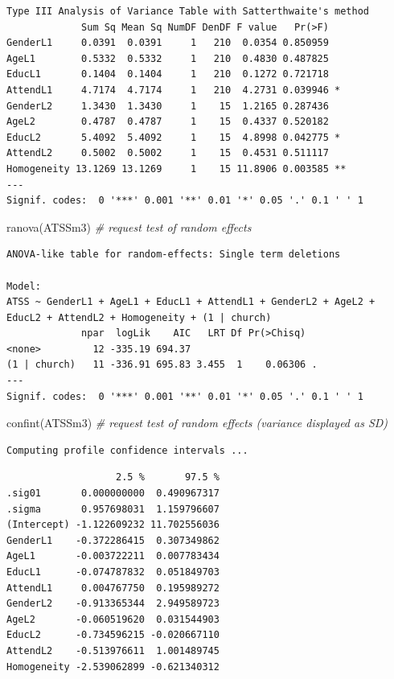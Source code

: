 \documentclass[
  english,
]{book}
\newenvironment{Shaded}{\begin{snugshade}}{\end{snugshade}}
\newcommand{\CommentTok}[1]{\textcolor[rgb]{0.56,0.35,0.01}{\textit{#1}}}
\newcommand{\FunctionTok}[1]{\textcolor[rgb]{0.00,0.00,0.00}{#1}}
\newcommand{\NormalTok}[1]{#1}
\begin{document}
\begin{verbatim}
Type III Analysis of Variance Table with Satterthwaite's method
             Sum Sq Mean Sq NumDF DenDF F value   Pr(>F)   
GenderL1     0.0391  0.0391     1   210  0.0354 0.850959   
AgeL1        0.5332  0.5332     1   210  0.4830 0.487825   
EducL1       0.1404  0.1404     1   210  0.1272 0.721718   
AttendL1     4.7174  4.7174     1   210  4.2731 0.039946 * 
GenderL2     1.3430  1.3430     1    15  1.2165 0.287436   
AgeL2        0.4787  0.4787     1    15  0.4337 0.520182   
EducL2       5.4092  5.4092     1    15  4.8998 0.042775 * 
AttendL2     0.5002  0.5002     1    15  0.4531 0.511117   
Homogeneity 13.1269 13.1269     1    15 11.8906 0.003585 **
---
Signif. codes:  0 '***' 0.001 '**' 0.01 '*' 0.05 '.' 0.1 ' ' 1
\end{verbatim}

\begin{Shaded}
\begin{Highlighting}[]
\FunctionTok{ranova}\NormalTok{(ATSSm3) }\CommentTok{\# request test of random effects}
\end{Highlighting}
\end{Shaded}

\begin{verbatim}
ANOVA-like table for random-effects: Single term deletions

Model:
ATSS ~ GenderL1 + AgeL1 + EducL1 + AttendL1 + GenderL2 + AgeL2 + EducL2 + AttendL2 + Homogeneity + (1 | church)
             npar  logLik    AIC   LRT Df Pr(>Chisq)  
<none>         12 -335.19 694.37                      
(1 | church)   11 -336.91 695.83 3.455  1    0.06306 .
---
Signif. codes:  0 '***' 0.001 '**' 0.01 '*' 0.05 '.' 0.1 ' ' 1
\end{verbatim}

\begin{Shaded}
\begin{Highlighting}[]
\FunctionTok{confint}\NormalTok{(ATSSm3) }\CommentTok{\# request test of random effects (variance displayed as SD)}
\end{Highlighting}
\end{Shaded}

\begin{verbatim}
Computing profile confidence intervals ...
\end{verbatim}

\begin{verbatim}
                   2.5 %       97.5 %
.sig01       0.000000000  0.490967317
.sigma       0.957698031  1.159796607
(Intercept) -1.122609232 11.702556036
GenderL1    -0.372286415  0.307349862
AgeL1       -0.003722211  0.007783434
EducL1      -0.074787832  0.051849703
AttendL1     0.004767750  0.195989272
GenderL2    -0.913365344  2.949589723
AgeL2       -0.060519620  0.031544903
EducL2      -0.734596215 -0.020667110
AttendL2    -0.513976611  1.001489745
Homogeneity -2.539062899 -0.621340312
\end{verbatim}
\end{document}
